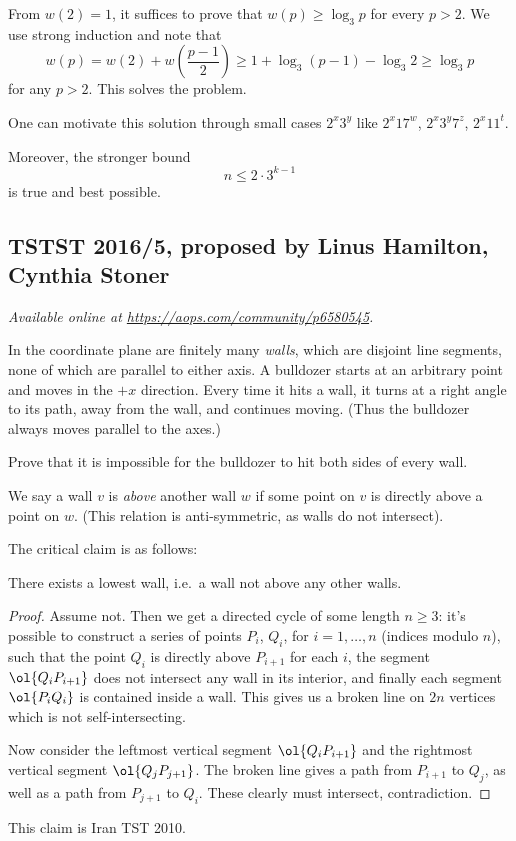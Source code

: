 \documentclass[11pt]{scrartcl}
\begin{document}
From $w(2) = 1$,
it suffices to prove that $w(p) \ge \log_3 p$ for every $p > 2$.
We use strong induction and note that
\[
 w(p) = w(2) + w\left( \frac{p-1}{2} \right)
 \ge 1 + \log_3(p-1) - \log_3 2 \ge \log_3 p
\]
for any $p > 2$.
This solves the problem.

\begin{remark*}
One can motivate this solution through small cases $2^x 3^y$
like $2^x 17^w$, $2^x 3^y 7^z$, $2^x 11^t$.

Moreover, the stronger bound \[ n \le 2 \cdot 3^{k-1} \]
is true and best possible.
\end{remark*}
\pagebreak

\subsection{TSTST 2016/5, proposed by Linus Hamilton, Cynthia Stoner}
\textsl{Available online at \url{https://aops.com/community/p6580545}.}
\begin{mdframed}[style=mdpurplebox,frametitle={Problem statement}]
In the coordinate plane are finitely many \emph{walls},
which are disjoint line segments, none of which are parallel to either axis.
A bulldozer starts at an arbitrary point and moves in the $+x$ direction.
Every time it hits a wall, it turns at a right angle to its path,
away from the wall, and continues moving.
(Thus the bulldozer always moves parallel to the axes.)

Prove that it is impossible for the bulldozer
to hit both sides of every wall.
\end{mdframed}
We say a wall $v$ is \emph{above} another wall $w$ if some point on
$v$ is directly above a point on $w$.
(This relation is anti-symmetric, as walls do not intersect).

The critical claim is as follows:
\begin{claim*}
  There exists a lowest wall,
  i.e.\ a wall not above any other walls.
\end{claim*}
\begin{proof}
  Assume not.
  Then we get a directed cycle of some length $n \ge 3$:
  it's possible to construct a series of points $P_i$, $Q_i$,
  for $i = 1, \dots, n$ (indices modulo $n$), such that
  the point $Q_i$ is directly above $P_{i+1}$ for each $i$,
  the segment $\ol{Q_i P_{i+1}}$ does not intersect any wall in its interior,
  and finally each segment $\ol{P_i Q_i}$ is contained inside a wall.
  This gives us a broken line on $2n$ vertices which is not self-intersecting.

  Now consider the leftmost vertical segment $\ol{Q_i P_{i+1}}$
  and the rightmost vertical segment $\ol{Q_j P_{j+1}}$.
  The broken line gives a path from $P_{i+1}$ to $Q_j$,
  as well as a path from $P_{j+1}$ to $Q_i$.
  These clearly must intersect, contradiction.
\end{proof}
\begin{remark*}
  This claim is Iran TST 2010.
\end{remark*}
\end{document}
